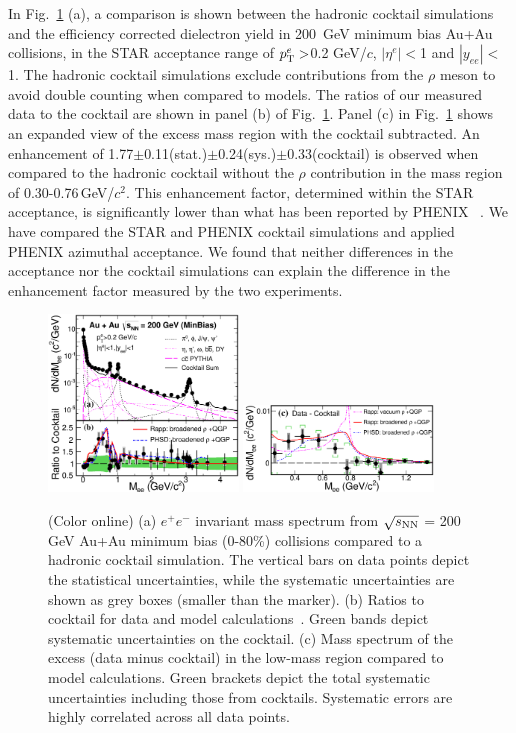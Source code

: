 \documentclass[twocolumn,showpacs,amsmath,amssymb,superscriptaddress,nofootinbib]{revtex4-1}
\newcommand{\sNN}{$\sqrt{s_{\rm NN}}$ }
\begin{document}
In Fig.~\ref{invMass} (a), a comparison is shown between the hadronic cocktail simulations and the efficiency corrected dielectron yield in 200\ GeV minimum bias Au+Au collisions, in the STAR acceptance range of $p_{\rm T}^e>$0.2 GeV/$c$, $|\eta^e|<$1 and $|y_{ee}|<$1. The hadronic cocktail simulations exclude contributions from the $\rho$ meson to avoid double counting when compared to models. The ratios of our measured data to the cocktail are shown in panel (b) of Fig.~\ref{invMass}. Panel (c) in Fig.~\ref{invMass} shows an expanded view of the excess mass region with the cocktail subtracted.
An enhancement of 1.77$\pm$0.11(stat.)$\pm$0.24(sys.)$\pm$0.33(cocktail) is observed when compared to the hadronic cocktail without the $\rho$ contribution in the mass region of 0.30-0.76\,GeV/$c^2$. This enhancement factor, determined within the STAR acceptance, is significantly lower than what has been reported by PHENIX ~\cite{PHENIX}.
We have compared the STAR and PHENIX cocktail simulations and applied PHENIX azimuthal acceptance. We found that neither differences in the acceptance nor the cocktail simulations can explain the difference in the enhancement factor measured by the two experiments.


\begin{figure}[h]
\centering
\includegraphics[width=0.45\textwidth]{corrYieldmb_PRL.eps}
\includegraphics[width=0.45\textwidth]{200mb_excess.eps}
\caption{(Color online) (a) $e^+e^-$ invariant mass spectrum from \sNN = 200 GeV Au+Au minimum bias (0-80\%) collisions compared to a hadronic cocktail simulation.
The vertical bars on data points depict the statistical uncertainties, while the systematic uncertainties are shown as grey boxes (smaller than the marker).
(b) Ratios to cocktail for data and model calculations~\cite{RappPriv,PHSDEE}. Green bands
depict systematic uncertainties on the cocktail.
(c) Mass spectrum of the excess (data minus cocktail) in the low-mass region compared to model calculations. Green brackets depict the total systematic uncertainties including those from cocktails. Systematic errors are highly correlated across all data points.
}
\label{invMass}
\end{figure}
\end{document}
